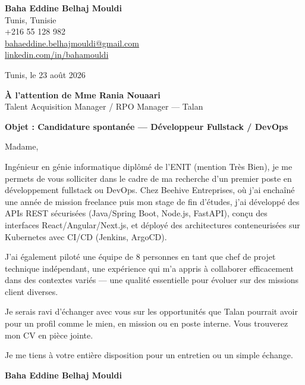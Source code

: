 \documentclass[a4paper,11pt]{article}
\begin{document}
\begin{flushright}
{\bfseries Baha Eddine Belhaj Mouldi}\\
Tunis, Tunisie\\
+216 55 128 982\\
\href{mailto:bahaeddine.belhajmouldi@gmail.com}{bahaeddine.belhajmouldi@gmail.com}\\
\href{https://linkedin.com/in/bahamouldi}{linkedin.com/in/bahamouldi}
\end{flushright}
\vspace{0.8cm}
\begin{flushleft}
Tunis, le 23 ao\^ut 2026
\vspace{0.8cm}

{\bfseries \`A l'attention de Mme Rania Nouaari}\\
Talent Acquisition Manager / RPO Manager --- Talan
\vspace{0.6cm}

{\bfseries Objet : Candidature spontan\'ee --- D\'eveloppeur Fullstack / DevOps}
\end{flushleft}
\vspace{0.6cm}
Madame,

Ing\'enieur en g\'enie informatique dipl\^om\'e de l'ENIT (mention Tr\`es Bien), je me permets de vous solliciter dans le cadre de ma recherche d'un premier poste en d\'eveloppement fullstack ou DevOps. Chez Beehive Entreprises, o\`u j'ai encha\^in\'e une ann\'ee de mission freelance puis mon stage de fin d'\'etudes, j'ai d\'evelopp\'e des APIs REST s\'ecuris\'ees (Java/Spring Boot, Node.js, FastAPI), con\c cu des interfaces React/Angular/Next.js, et d\'eploy\'e des architectures conteneuris\'ees sur Kubernetes avec CI/CD (Jenkins, ArgoCD).

J'ai \'egalement pilot\'e une \'equipe de 8 personnes en tant que chef de projet technique ind\'ependant, une exp\'erience qui m'a appris \`a collaborer efficacement dans des contextes vari\'es --- une qualit\'e essentielle pour \'evoluer sur des missions client diverses.

Je serais ravi d'\'echanger avec vous sur les opportunit\'es que Talan pourrait avoir pour un profil comme le mien, en mission ou en poste interne. Vous trouverez mon CV en pi\`ece jointe.

Je me tiens \`a votre enti\`ere disposition pour un entretien ou un simple \'echange.

\vspace{0.8cm}
\begin{flushright}
{\bfseries Baha Eddine Belhaj Mouldi}
\end{flushright}
\end{document}
